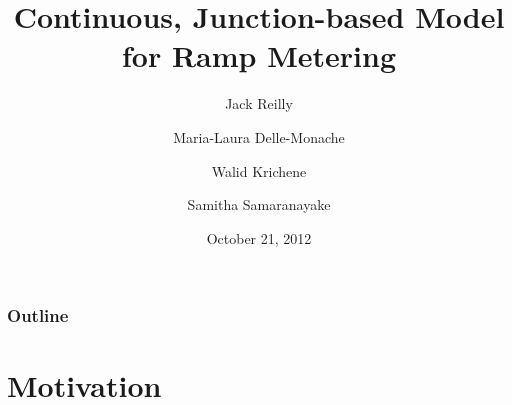 \documentclass{beamer}
\begin{document}
\title[Cont. model for ramps]{Continuous, Junction-based Model for Ramp Metering}

\author[Reilly et al.]{Jack Reilly
\and
Maria-Laura Delle-Monache
\and
Walid Krichene
\and
Samitha Samaranayake}


\date{October 21, 2012}





\begin{frame}
\titlepage
\end{frame}

\begin{frame}[plain]
\frametitle{Outline}
\tableofcontents
\end{frame}

\section{Motivation}
\end{document}
